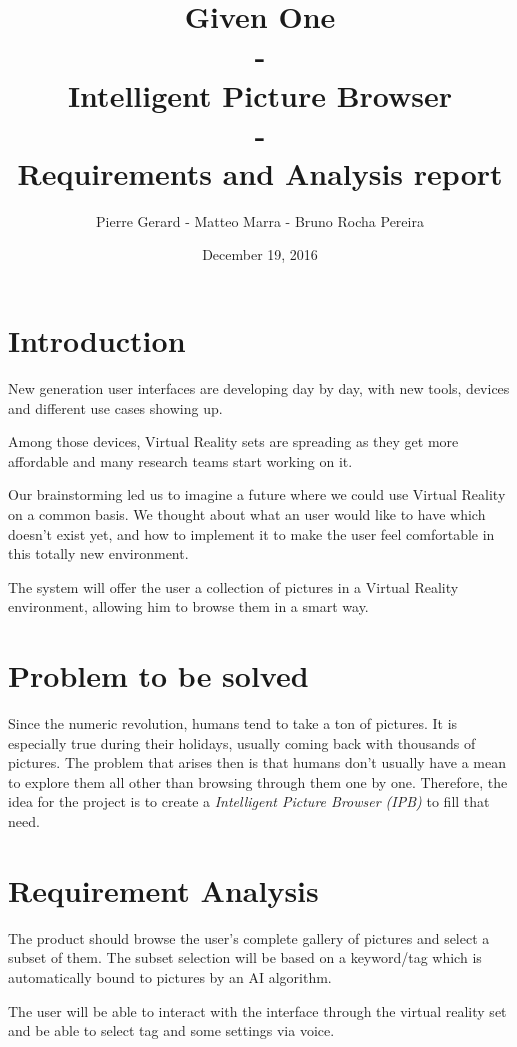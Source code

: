 \documentclass[11pt,a4paper]{article}
\author{Pierre Gerard - Matteo Marra - Bruno Rocha Pereira}
\title{Given One \\ - \\Intelligent Picture Browser \\  - \\Requirements and Analysis report}
\date{December 19, 2016}
\begin{document}
\maketitle

\section{Introduction}

New generation user interfaces are developing day by day, with new tools, devices and different use cases showing up.

Among those devices, Virtual Reality sets are spreading as they get more affordable and many research teams start working on it. 

Our brainstorming led us to imagine a future where we could use Virtual Reality on a common basis. We thought about what an user would like to have which doesn't exist yet, and how to implement it to make the user feel comfortable in this totally new environment.

The system will offer the user a collection of pictures in a Virtual Reality environment, allowing him to browse them in a smart way.

\section{Problem to be solved}

Since the numeric revolution, humans tend to take a ton of pictures. It is especially true during their holidays, usually coming back with thousands of pictures. The problem that arises then is that humans don't usually have a mean to explore them all other than browsing through them one by one. Therefore, the idea for the project is to create a \textit{Intelligent Picture Browser (IPB)} to fill that need.

\section{Requirement Analysis} \label{requi}

The product should browse the user's complete gallery of pictures and select a subset of them. The subset selection will be based on a keyword/tag which is automatically bound to pictures by an AI algorithm.

The user will be able to interact with the interface through the virtual reality set and be able to select tag and some settings via voice.
\end{document}
